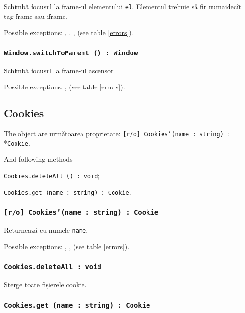 Schimbă focusul la frame-ul elementului \texttt{el}. Elementul trebuie să fir numaidecît tag frame sau iframe.

Possible exceptions: , , ,  (see table \ref{errors}).

\subsubsection{\texttt{Window.switchToParent () : Window}}

Schimbă focusul la frame-ul ascensor.

Possible exceptions: ,  (see table \ref{errors}).

\subsection{{\color{orange} Cookies}}

The object \cookies{} are următoarea proprietate: \texttt{[r/o] Cookies'(name : string) :} \\*\texttt{Cookie}.

And following methods — 
\begin{icItems}
	\item \texttt{Cookies.deleteAll () : void};
	\item \texttt{Cookies.get (name : string) : Cookie}.
\end{icItems}

\subsubsection{\texttt{[r/o] Cookies'(name : string) : Cookie}}

Returnează \cookie{} cu numele \texttt{name}.

Possible exceptions: , ,  (see table \ref{errors}).

\subsubsection{\texttt{Cookies.deleteAll : void}}

Șterge toate fișierele cookie.

\subsubsection{\texttt{Cookies.get (name : string) : Cookie}}

